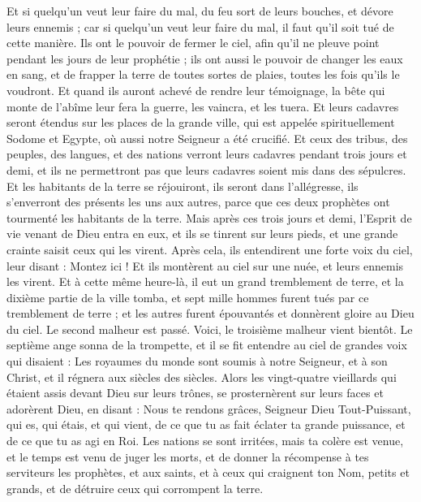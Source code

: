 \begin{multicols}{2}
Et si quelqu'un veut leur faire du mal, du feu sort de leurs bouches, et dévore leurs ennemis ; car si quelqu'un veut leur faire du mal, il faut qu'il soit tué de cette manière.
Ils ont le pouvoir de fermer le ciel, afin qu'il ne pleuve point pendant les jours de leur prophétie ; ils ont aussi le pouvoir de changer les eaux en sang, et de frapper la terre de toutes sortes de plaies, toutes les fois qu'ils le voudront.
Et quand ils auront achevé de rendre leur témoignage, la bête qui monte de l'abîme leur fera la guerre, les vaincra, et les tuera.
Et leurs cadavres seront étendus sur les places de la grande ville, qui est appelée spirituellement Sodome et Egypte, où aussi notre Seigneur a été crucifié.
Et ceux des tribus, des peuples, des langues, et des nations verront leurs cadavres pendant trois jours et demi, et ils ne permettront pas que leurs cadavres soient mis dans des sépulcres.
Et les habitants de la terre se réjouiront, ils seront dans l'allégresse, ils s'enverront des présents les uns aux autres, parce que ces deux prophètes ont tourmenté les habitants de la terre.
Mais après ces trois jours et demi, l'Esprit de vie venant de Dieu entra en eux, et ils se tinrent sur leurs pieds, et une grande crainte saisit ceux qui les virent.
Après cela, ils entendirent une forte voix du ciel, leur disant : Montez ici ! Et ils montèrent au ciel sur une nuée, et leurs ennemis les virent.
Et à cette même heure-là, il eut un grand tremblement de terre, et la dixième partie de la ville tomba, et sept mille hommes furent tués par ce tremblement de terre ; et les autres furent épouvantés et donnèrent gloire au Dieu du ciel.
Le second malheur est passé. Voici, le troisième malheur vient bientôt.
Le septième ange sonna de la trompette, et il se fit entendre au ciel de grandes voix qui disaient : Les royaumes du monde sont soumis à notre Seigneur, et à son Christ, et il régnera aux siècles des siècles.
Alors les vingt-quatre vieillards qui étaient assis devant Dieu sur leurs trônes, se prosternèrent sur leurs faces et adorèrent Dieu,
en disant : Nous te rendons grâces, Seigneur Dieu Tout-Puissant, qui es, qui étais, et qui vient, de ce que tu as fait éclater ta grande puissance, et de ce que tu as agi en Roi.
Les nations se sont irritées, mais ta colère est venue, et le temps est venu de juger les morts, et de donner la récompense à tes serviteurs les prophètes, et aux saints, et à ceux qui craignent ton Nom, petits et grands, et de détruire ceux qui corrompent la terre.

\end{multicols}
